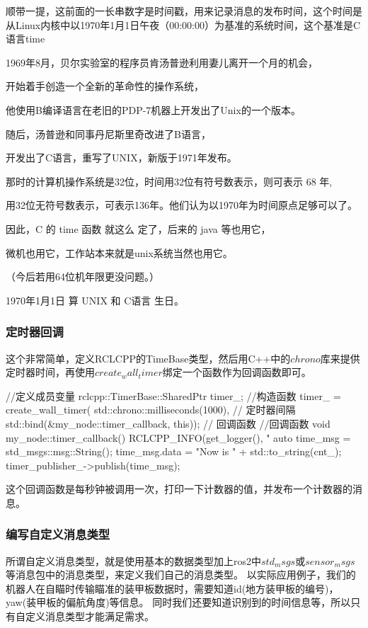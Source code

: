 顺带一提，这前面的一长串数字是时间戳，用来记录消息的发布时间，这个时间是从Linux内核中以1970年1月1日午夜（00:00:00）为基准的系统时间，这个基准是C语言time
\begin{tcode}
    1969年8月，贝尔实验室的程序员肯汤普逊利用妻儿离开一个月的机会，

    开始着手创造一个全新的革命性的操作系统，
    
    他使用B编译语言在老旧的PDP-7机器上开发出了Unix的一个版本。

    随后，汤普逊和同事丹尼斯里奇改进了B语言，
    
    开发出了C语言，重写了UNIX，新版于1971年发布。

    那时的计算机操作系统是32位，时间用32位有符号数表示，则可表示 68 年,

    用32位无符号数表示，可表示136年。他们认为以1970年为时间原点足够可以了。 

    因此，C 的 time 函数 就这么 定了，后来的 java 等也用它，
    
    微机也用它，工作站本来就是unix系统当然也用它。
    
    （今后若用64位机年限更没问题。）

    1970年1月1日 算 UNIX 和 C语言 生日。
\end{tcode}

\subsubsection{定时器回调}
这个非常简单，定义RCLCPP的TimeBase类型，然后用C++中的$chrono$库来提供定时器时间，再使用$create_wall_timer$绑定一个函数作为回调函数即可。
\begin{tcode}
    //定义成员变量
    rclcpp::TimerBase::SharedPtr timer_;
    //构造函数
    timer_ = create_wall_timer(
        std::chrono::milliseconds(1000), // 定时器间隔
        std::bind(&my_node::timer_callback, this)); // 回调函数
    //回调函数
    void my_node::timer_callback()
    {
        RCLCPP_INFO(get_logger(), "%
        auto time_msg = std_msgs::msg::String();
        time_msg.data = "Now is " + std::to_string(cnt_);
        timer_publisher_->publish(time_msg);
    }
\end{tcode}
这个回调函数是每秒钟被调用一次，打印一下计数器的值，并发布一个计数器的消息。

\subsubsection{编写自定义消息类型}
所谓自定义消息类型，就是使用基本的数据类型加上ros2中$std_msgs$或$sensor_msgs$等消息包中的消息类型，来定义我们自己的消息类型。
以实际应用例子，我们的机器人在自瞄时传输瞄准的装甲板数据时，需要知道id(地方装甲板的编号)，yaw(装甲板的偏航角度)等信息。
同时我们还要知道识别到的时间信息等，所以只有自定义消息类型才能满足需求。


